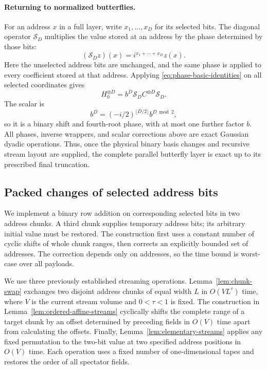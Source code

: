 \paragraph{Returning to normalized butterflies.}
For an address $x$ in a full layer, write $x_1,\ldots,x_D$ for its
selected bits.
The diagonal operator $\mathcal S_D$ multiplies the value stored at
an address by the phase determined by those bits:
\[
 (\mathcal S_D z)(x)=i^{x_1+\cdots+x_D}z(x).
\]
Here the unselected address bits are unchanged, and the same phase is
applied to every coefficient stored at that address.  Applying
\eqref{eq:phase-basic-identities} on all selected coordinates gives
\begin{equation}\label{eq:phase-butterfly-layer}
 H_0^{\otimes D}=b^D\mathcal S_D C^{\otimes D}\mathcal S_D.
\end{equation}
The scalar is
\[
 b^D=(-i/2)^{\lfloor D/2\rfloor}b^{D\bmod2},
\]
so it is a binary shift and fourth-root phase, with at most one further
factor $b$.  All phases, inverse wrappers, and scalar corrections above
are exact Gaussian dyadic operations.  Thus, once the physical binary
basis changes and recursive stream layout are supplied, the complete
parallel butterfly layer is exact up to its prescribed final truncation.

\subsection{Packed changes of selected address bits}
\label{sec:packed-selected-bits}

We implement a binary row addition on corresponding selected bits in two
address chunks. A third chunk supplies temporary address bits; its arbitrary
initial value must be restored. The construction first uses a constant number
of cyclic shifts of whole chunk ranges, then corrects an explicitly bounded set of
addresses. The correction depends only on addresses, so the time bound is
worst-case over all payloads.

We use three previously established streaming operations.
Lemma~\ref{lem:chunk-swap} exchanges two disjoint address chunks of
equal width $L$ in $O(VL^\tau)$ time, where $V$ is the current stream
volume and $0<\tau<1$ is fixed.  The construction in
Lemma~\ref{lem:ordered-affine-streams} cyclically shifts the complete
range of a target chunk by an offset determined by preceding fields in
$O(V)$ time apart from calculating the offsets.  Finally,
Lemma~\ref{lem:elementary-streams} applies any fixed permutation to the
two-bit value at two specified address positions in $O(V)$ time.
Each operation uses a fixed number of one-dimensional
tapes and restores the order of all spectator fields.

